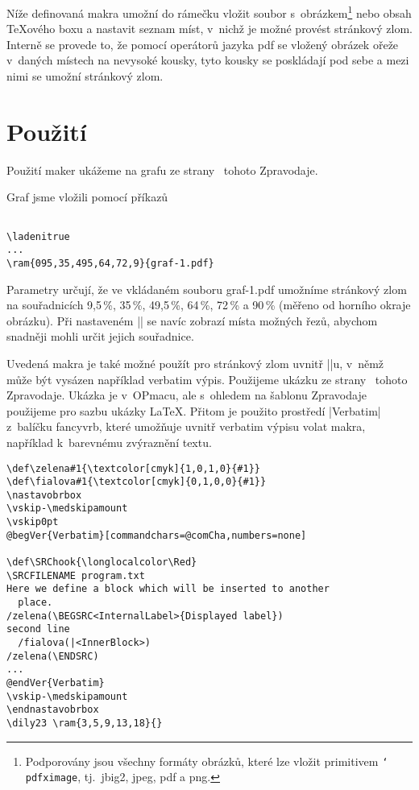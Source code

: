 \documentclass{csbulletin}
\def\p#1{\texttt{\char`\\#1}}
\def\soub#1{{\sf#1}}
\begin{document}
Níže definovaná makra umožní do rámečku vložit soubor s~obrázkem\footnote{Podporovány jsou všechny formáty obrázků, které lze vložit primitivem \p{pdfximage}, tj.~\soub{jbig2}, \soub{jpeg}, \soub{pdf} a \soub{png}.} nebo obsah \TeX ového boxu a nastavit seznam míst, v~nichž je možné provést stránkový zlom. Interně se provede to, že pomocí operátorů jazyka pdf se vložený obrázek ořeže v~daných místech na nevysoké kousky, tyto kousky se poskládají pod sebe a mezi nimi se umožní stránkový zlom.

\JSvvvskip

\section{Použití}

Použití maker ukážeme na grafu ze strany~\pageref{literate-s15} tohoto Zpravodaje.

\ladenitrue
{}

\noindent
Graf jsme vložili pomocí příkazů
\begin{Verbatim}[numbers=none]

\ladenitrue
...
\ram{095,35,495,64,72,9}{graf-1.pdf}
\end{Verbatim}
\noindent
Parametry určují, že ve vkládaném souboru \soub{graf-1.pdf} umožníme stránkový zlom na souřadnicích 9,5\,\%, 35\,\%, 49,5\,\%, 64\,\%, 72\,\% a 90\,\% (měřeno od horního okraje obrázku). Při nastaveném |\ladenitrue| se navíc zobrazí místa možných řezů, abychom snadněji mohli určit jejich souřadnice.

\def\nastavobrbox{\setbox\obrbox\vbox\bgroup
  \hsize\dimexpr\hsize-2\hodstup\relax}
\def\endnastavobrbox{\egroup}

Uvedená makra je také možné použít pro stránkový zlom uvnitř |\vbox|u, v~němž může být vysázen například verbatim výpis. Použijeme ukázku ze strany~\pageref{literate-pripravaukazka} tohoto Zpravodaje. Ukázka je v~OPmacu, ale s~ohledem na šablonu Zpravodaje použijeme pro sazbu ukázky \LaTeX. Přitom je použito prostředí |Verbatim| z~balíčku \soub{fancyvrb}, které umožňuje uvnitř verbatim výpisu volat makra, například k~barevnému zvýraznění textu.

\def\begVer{\char`\\begin}
\def\comCha{/()}
\def\endVer{\char`\\end}
\begin{Verbatim}[commandchars=@QW,numbers=none]
\def\zelena#1{\textcolor[cmyk]{1,0,1,0}{#1}}
\def\fialova#1{\textcolor[cmyk]{0,1,0,0}{#1}}
\nastavobrbox
\vskip-\medskipamount
\vskip0pt
@begVer{Verbatim}[commandchars=@comCha,numbers=none]

\def\SRChook{\longlocalcolor\Red}
\SRCFILENAME program.txt
Here we define a block which will be inserted to another
  place.
/zelena(\BEGSRC<InternalLabel>{Displayed label})
second line
  /fialova(|<InnerBlock>)
/zelena(\ENDSRC)
...
@endVer{Verbatim}
\vskip-\medskipamount
\endnastavobrbox
\dily23 \ram{3,5,9,13,18}{}
\end{Verbatim}
\end{document}
